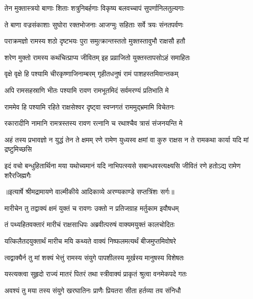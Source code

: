 \twolineshloka
{तेन मुक्तास्त्रयो बाणाः शिताः शत्रुनिबर्हणाः}
{विकृष्य बलवच्चापं सुपर्णानिलतुल्यगाः} %

\twolineshloka
{ते बाणा वज्रसंकाशाः सुघोरा रक्तभोजनाः}
{आजग्मुः सहिताः सर्वे त्रयः संनतपर्वणः} %

\twolineshloka
{पराक्रमज्ञो रामस्य शठो दृष्टभयः पुरा}
{समुत्क्रान्तस्ततो मुक्तस्तावुभौ राक्षसौ हतौ} %

\twolineshloka
{शरेण मुक्तो रामस्य कथंचित्प्राप्य जीवितम्}
{इह प्रव्राजितो युक्तस्तापसोऽहं समाहितः} %

\twolineshloka
{वृक्षे वृक्षे हि पश्यामि चीरकृष्णाजिनाम्बरम्}
{गृहीतधनुषं रामं पाशहस्तमिवान्तकम्} %

\twolineshloka
{अपि रामसहस्राणि भीतः पश्यामि रावण}
{रामभूतमिदं सर्वमरण्यं प्रतिभाति मे} %

\twolineshloka
{राममेव हि पश्यामि रहिते राक्षसेश्वर}
{दृष्ट्वा स्वप्नगतं राममुद्भ्रमामि विचेतनः} %

\twolineshloka
{रकारादीनि नामानि रामत्रस्तस्य रावण}
{रत्नानि च रथाश्चैव त्रासं संजनयन्ति मे} %

\threelineshloka
{अहं तस्य प्रभावज्ञो न युद्धं तेन ते क्षमम्}
{रणे रामेण युध्यस्व क्षमां वा कुरु राक्षस}
{न ते रामकथा कार्या यदि मां द्रष्टुमिच्छसि} %

\fourlineindentedshloka
{इदं वचो बन्धुहितार्थिना मया}
{ यथोच्यमानं यदि नाभिपत्स्यसे}
{सबान्धवस्त्यक्ष्यसि जीवितं रणे}
{ हतोऽद्य रामेण शरैरजिह्मगैः} %


{॥इत्यार्षे श्रीमद्रामायणे वाल्मीकीये आदिकाव्ये अरण्यकाण्डे सप्तत्रिंशः सर्गः॥}


\twolineshloka
{मारीचेन तु तद्वाक्यं क्षमं युक्तं च रावणः}
{उक्तो न प्रतिजग्राह मर्तुकाम इवौषधम्} %

\twolineshloka
{तं पथ्यहितवक्तारं मारीचं राक्षसाधिपः}
{अब्रवीत्परुषं वाक्यमयुक्तं कालचोदितः} %

\twolineshloka
{यत्किलैतदयुक्तार्थं मारीच मयि कथ्यते}
{वाक्यं निष्फलमत्यर्थं बीजमुप्तमिवोषरे} %

\twolineshloka
{त्वद्वाक्यैर्न तु मां शक्यं भेत्तुं रामस्य संयुगे}
{पापशीलस्य मूर्खस्य मानुषस्य विशेषतः} %

\twolineshloka
{यस्त्यक्त्वा सुहृदो राज्यं मातरं पितरं तथा}
{स्त्रीवाक्यं प्राकृतं श्रुत्वा वनमेकपदे गतः} %

\twolineshloka
{अवश्यं तु मया तस्य संयुगे खरघातिनः}
{प्राणैः प्रियतरा सीता हर्तव्या तव संनिधौ} %

